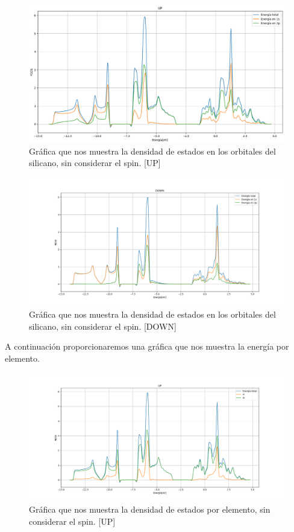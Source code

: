 \begin{figure}[H]
    \centering
    \includegraphics[scale=0.28]{images_silicano/Densidad_estados_sin_spin_up.png}
    \caption{Gráfica que nos muestra la densidad de estados en los orbitales del silicano, sin considerar el spin. [UP]}
\end{figure}

\begin{figure}[H]
    \centering
    \includegraphics[scale=0.38]{images_silicano/Densidad_estados_sin_spin_down.png}
    \caption{Gráfica que nos muestra la densidad de estados en los orbitales del silicano, sin considerar el spin. [DOWN]}
\end{figure}

\vspace{0.5cm}

A continuación proporcionaremos una gráfica que nos muestra la energía por elemento.

\begin{figure}[H]
    \centering
    \includegraphics[scale=0.38]{images_silicano/Densidad_estados_sin_spin_up_elementos.png}
    \caption{Gráfica que nos muestra la densidad de estados por elemento, sin considerar el spin. [UP]}
\end{figure}

